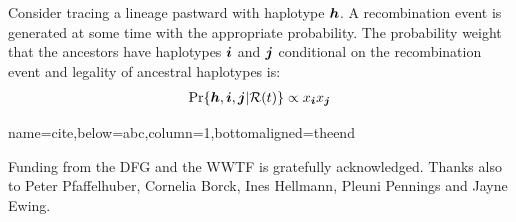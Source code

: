 \documentclass[portrait,final]{baposter}
\begin{document}
\begin{poster}
{Consider tracing a lineage pastward with haplotype $\boldsymbol{h}$. A recombination
event is generated at some time with the appropriate probability. The probability
weight that the ancestors have haplotypes $\boldsymbol{i}$ and $\boldsymbol{j}$ conditional on
the recombination event and legality of ancestral haplotypes is:
\vspace{-3ex}
\begin{align*}
	\Pr\{\boldsymbol{h},\boldsymbol{i},\boldsymbol{j}|\mathcal{R}(t)\} \propto x_{\boldsymbol{i}}x_{\boldsymbol{j}}
\end{align*}
  
} 


{name=cite,below=abc,column=1,bottomaligned=theend} { 
\small 

Funding from the DFG and the WWTF is gratefully acknowledged. Thanks also to
Peter Pfaffelhuber, Cornelia Borck, Ines Hellmann, Pleuni Pennings and Jayne
Ewing.

\vspace{-1.2cm}

\renewcommand\refname{}

}


\end{poster}%
\end{document}
